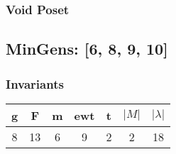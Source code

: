 \documentclass[a4paper]{article}
\begin{document}
\hfill\begin{minipage}{0.48\textwidth}
\subsubsection*{Void Poset}
\centering
{}
\end{minipage}
\newpage\subsection{MinGens: [6, 8, 9, 10]}
\noindent\begin{minipage}{0.6\textwidth}
\subsubsection*{Invariants}
\centering
\begin{tabular}{|c|c|c|c|c|c|c|}
\toprule
g & F & m & ewt & t & \(|M|\) & \(|\lambda|\) \\
\midrule
8 & 13 & 6 & 9 & 2 & 2 & 18 \\
\bottomrule
\end{tabular}
\end{minipage}%
\end{document}
